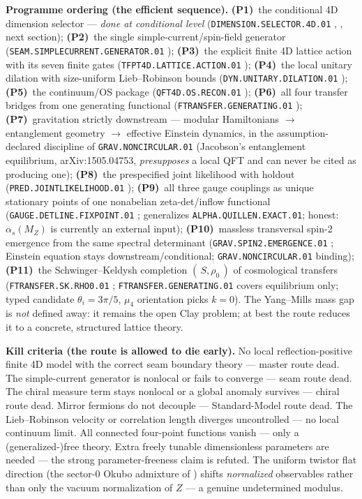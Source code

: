 \documentclass[11pt,a4paper]{article}
\begin{document}
\par\smallskip\noindent\textbf{Programme ordering (the efficient sequence).}
\textbf{(P1)}~the conditional 4D dimension selector --- \emph{done at conditional level}
(\texttt{DIMENSION.SELECTOR.4D.01} \mC, , next section);
\textbf{(P2)}~the single simple-current/spin-field generator
(\texttt{SEAM.SIMPLECURRENT.GENERATOR.01} \mO);
\textbf{(P3)}~the explicit finite 4D lattice action with its seven finite gates
(\texttt{TFPT4D.LATTICE.ACTION.01} \mO);
\textbf{(P4)}~the local unitary dilation with size-uniform Lieb--Robinson bounds
(\texttt{DYN.UNITARY.DILATION.01} \mO);
\textbf{(P5)}~the continuum/OS package (\texttt{QFT4D.OS.RECON.01} \mO);
\textbf{(P6)}~all four transfer bridges from one generating functional
(\texttt{FTRANSFER.GENERATING.01} \mO);
\textbf{(P7)}~gravitation strictly downstream --- modular Hamiltonians $\to$ entanglement
geometry $\to$ effective Einstein dynamics, in the assumption-declared discipline of
\texttt{GRAV.NONCIRCULAR.01} (Jacobson's entanglement equilibrium, arXiv:1505.04753,
\emph{presupposes} a local QFT and can never be cited as producing one);
\textbf{(P8)}~the prespecified joint likelihood with holdout
(\texttt{PRED.JOINTLIKELIHOOD.01} \mO);
\textbf{(P9)}~all three gauge couplings as unique stationary points of one nonabelian
zeta-det/inflow functional (\texttt{GAUGE.DETLINE.FIXPOINT.01} \mO; generalizes
\texttt{ALPHA.QUILLEN.EXACT.01}; honest: $\alpha_s(M_Z)$ is currently an external input);
\textbf{(P10)}~massless transversal spin-2 emergence from the same spectral determinant
(\texttt{GRAV.SPIN2.EMERGENCE.01} \mO; Einstein equation stays downstream/conditional;
\texttt{GRAV.NONCIRCULAR.01} binding);
\textbf{(P11)}~the Schwinger--Keldysh completion $(\,S,\rho_0\,)$ of cosmological transfers
(\texttt{FTRANSFER.SK.RHO0.01} \mO; \texttt{FTRANSFER.GENERATING.01} covers equilibrium only;
typed candidate $\theta_i=3\pi/5$, $\mu_4$ orientation picks $k=0$).
The Yang--Mills mass gap is \emph{not} defined away: it remains the open Clay problem; at best
the route reduces it to a concrete, structured lattice theory.

\par\smallskip\noindent\textbf{Kill criteria (the route is allowed to die early).}
No local reflection-positive finite 4D model with the correct seam boundary theory --- master
route dead.  The simple-current generator is nonlocal or fails to converge --- seam route dead.
The chiral measure term stays nonlocal or a global anomaly survives --- chiral route dead.
Mirror fermions do not decouple --- Standard-Model route dead.  The Lieb--Robinson velocity or
correlation length diverges uncontrolled --- no local continuum limit.  All connected four-point
functions vanish --- only a (generalized-)free theory.  Extra freely tunable dimensionless
parameters are needed --- the strong parameter-freeness claim is refuted.  The uniform twistor
flat direction (the sector-0 Okubo admixture of ) shifts
\emph{normalized} observables rather than only the vacuum normalization of $Z$ --- a genuine
undetermined modulus.
\end{document}
